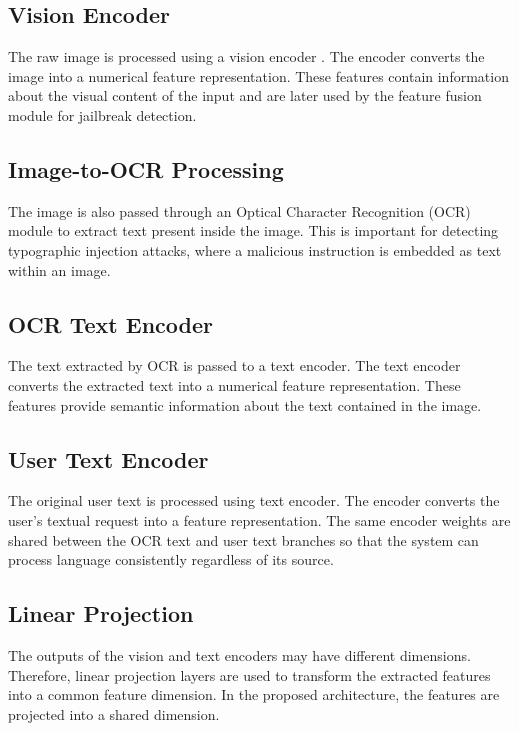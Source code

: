 \subsection{Vision Encoder}

The raw image is processed using a vision encoder . The encoder converts the image into a numerical feature representation. These features contain information about the visual content of the input and are later used by the feature fusion module for jailbreak detection.

\subsection{Image-to-OCR Processing}

The image is also passed through an Optical Character Recognition (OCR) module to extract text present inside the image. This is important for detecting typographic injection attacks, where a malicious instruction is embedded as text within an image.

\subsection{OCR Text Encoder}

The text extracted by OCR is passed to a text encoder. The text encoder converts the extracted text into a numerical feature representation. These features provide semantic information about the text contained in the image.

\subsection{User Text Encoder}

The original user text is processed using text encoder. The encoder converts the user's textual request into a feature representation. The same encoder weights are shared between the OCR text and user text branches so that the system can process language consistently regardless of its source.

\subsection{Linear Projection}

The outputs of the vision and text encoders may have different dimensions. Therefore, linear projection layers are used to transform the extracted features into a common feature dimension. In the proposed architecture, the features are projected into a shared dimension.


